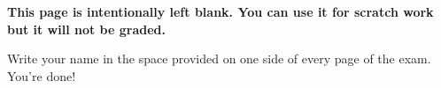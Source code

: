 \documentclass[twoside]{article}
\begin{document}
\clearpage
\textbf{This page is intentionally left blank. You can use it for scratch work but it will not be graded.}
~\newpage

\begin{enumerate}
      
      \clearpage
      
      \clearpage
      
      \clearpage
      
      \clearpage
      
%     
%     
%     
%     
%     
%     
%     
%     
     \vfill
      {}Write your name in the space provided on one side of every page of the exam.
     You're done!
\end{enumerate}
\end{document}
